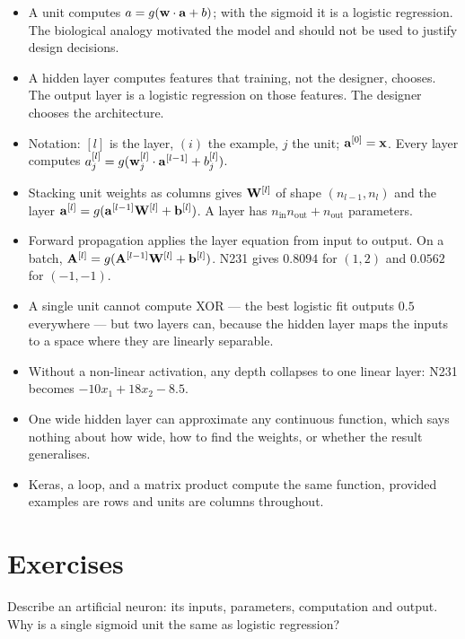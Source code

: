 \begin{itemize}
  \item A unit computes $a = g(\mathbf{w}\cdot\mathbf{a} + b)$; with the sigmoid it is a
        logistic regression. The biological analogy motivated the model and
        should not be used to justify design decisions.
  \item A hidden layer computes features that training, not the designer,
        chooses. The output layer is a logistic regression on those features.
        The designer chooses the architecture.
  \item Notation: $[l]$ is the layer, $(i)$ the example, $j$ the unit;
        $\mathbf{a}^{[0]} = \mathbf{x}$. Every layer computes
        $a^{[l]}_j = g(\mathbf{w}^{[l]}_j\cdot\mathbf{a}^{[l-1]} + b^{[l]}_j)$.
  \item Stacking unit weights as columns gives $\mathbf{W}^{[l]}$ of shape
        $(n_{l-1}, n_l)$ and the layer $\mathbf{a}^{[l]} = g(\mathbf{a}^{[l-1]}\mathbf{W}^{[l]} +
        \mathbf{b}^{[l]})$. A layer has $n_{\text{in}}n_{\text{out}} + n_{\text{out}}$
        parameters.
  \item Forward propagation applies the layer equation from input to output. On
        a batch, $\mathbf{A}^{[l]} = g(\mathbf{A}^{[l-1]}\mathbf{W}^{[l]} + \mathbf{b}^{[l]})$.
        N231 gives $0.8094$ for $(1,2)$ and $0.0562$ for $(-1,-1)$.
  \item A single unit cannot compute XOR --- the best logistic fit outputs $0.5$
        everywhere --- but two layers can, because the hidden layer maps the
        inputs to a space where they are linearly separable.
  \item Without a non-linear activation, any depth collapses to one linear
        layer: N231 becomes $-10x_1 + 18x_2 - 8.5$.
  \item One wide hidden layer can approximate any continuous function, which
        says nothing about how wide, how to find the weights, or whether the
        result generalises.
  \item Keras, a loop, and a matrix product compute the same function, provided
        examples are rows and units are columns throughout.
\end{itemize}

\section*{Exercises}


\sq Describe an artificial neuron: its inputs, parameters, computation and
output. Why is a single sigmoid unit the same as logistic regression?

